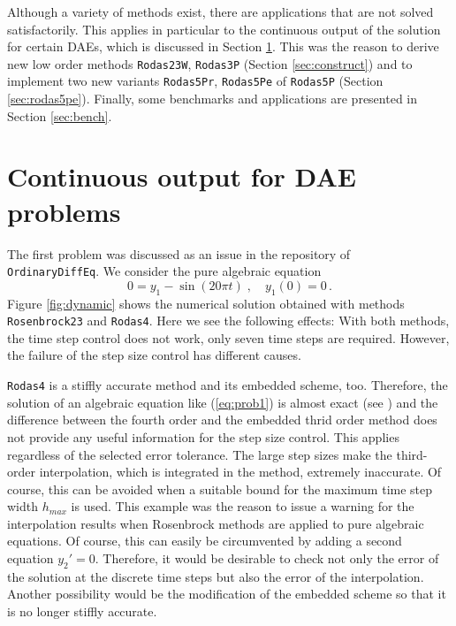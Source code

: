 \documentclass{juliacon}
\begin{document}
Although a variety of methods exist, there are applications that are not solved satisfactorily. This applies in particular to the continuous output of the 
solution for certain DAEs, which is discussed in Section \ref{sec:cont}.
This was the reason to derive new low order methods \verb|Rodas23W|, \verb|Rodas3P| (Section \ref{sec:construct}) and 
to implement two new variants \verb|Rodas5Pr|, \verb|Rodas5Pe| of \verb|Rodas5P| (Section \ref{sec:rodas5pe}).
Finally, some benchmarks and applications are presented in Section \ref{sec:bench}.

\section{Continuous output for DAE problems} \label{sec:cont}

The first problem was discussed as an issue in the repository of\\ \verb|OrdinaryDiffEq|.
We consider the pure algebraic equation
\begin{equation} 0 = y_1 - \sin(20 \pi t) \; , \quad y_1(0)=0 \, .\label{eq:prob1} \end{equation}
Figure \ref{fig:dynamic} shows the numerical solution obtained with methods \verb|Rosenbrock23| and \verb|Rodas4|.
Here we see the following effects: With both methods, the time step control does not work, only seven time steps are required. 
However, the failure of the step size control has different causes. 

\verb|Rodas4| is a stiffly accurate method and its embedded scheme, too. Therefore, the solution of an algebraic equation like (\ref{eq:prob1}) is 
almost exact (see \cite{hairer}) and the difference between the fourth order and the embedded thrid order method does not provide any useful information for the 
step size control.
This applies regardless of the selected error tolerance.
The large step sizes make the third-order interpolation, which is integrated in the method, extremely inaccurate.
Of course, this can be avoided when a suitable bound for the maximum time step width $h_{max}$ is used. 
This example was the reason to issue a warning for the interpolation results when Rosenbrock methods are applied to pure algebraic equations.
Of course, this can easily be circumvented by adding a second equation $y_2'=0$. 
Therefore, it would be desirable to check not only the error of the solution at the discrete time steps but also the error of the interpolation.
Another possibility would be the modification of the embedded scheme so that it is no longer stiffly accurate.
\end{document}
